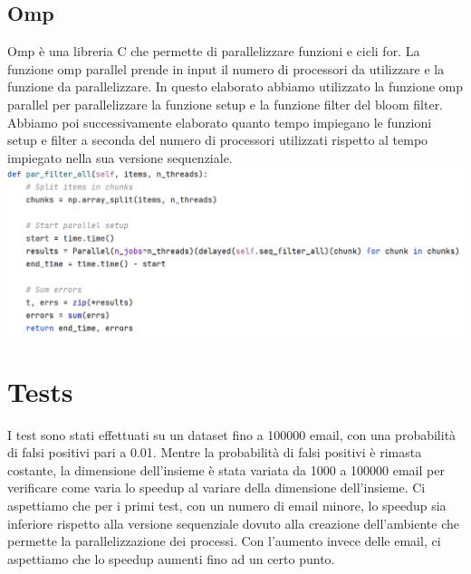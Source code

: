 \documentclass[11pt]{article}
\begin{document}
    \subsection{Omp}\label{subsec:omp}
    Omp è una libreria C che permette di parallelizzare funzioni e cicli for.
    La funzione omp parallel prende in input il numero di processori da utilizzare e la funzione da parallelizzare.
    In questo elaborato abbiamo utilizzato la funzione omp parallel per parallelizzare la funzione setup e la funzione filter del bloom filter.
    Abbiamo poi successivamente elaborato quanto tempo impiegano le funzioni setup e filter a seconda del numero di processori utilizzati rispetto al tempo impiegato nella sua versione sequenziale.
    \includegraphics[width=\textwidth]{../documentation/img/pycode/pycode (1)}

    \section{Tests}\label{sec:tests}
    I test sono stati effettuati su un dataset fino a 100000 email, con una probabilità di falsi positivi pari a 0.01.
    Mentre la probabilità di falsi positivi è rimasta costante, la dimensione dell'insieme è stata variata da 1000 a 100000 email per verificare come varia lo speedup al variare della dimensione dell'insieme.
    Ci aspettiamo che per i primi test, con un numero di email minore, lo speedup sia inferiore rispetto alla versione sequenziale dovuto alla creazione dell'ambiente che permette la parallelizzazione dei processi.
    Con l'aumento invece delle email, ci aspettiamo che lo speedup aumenti fino ad un certo punto.
\end{document}
